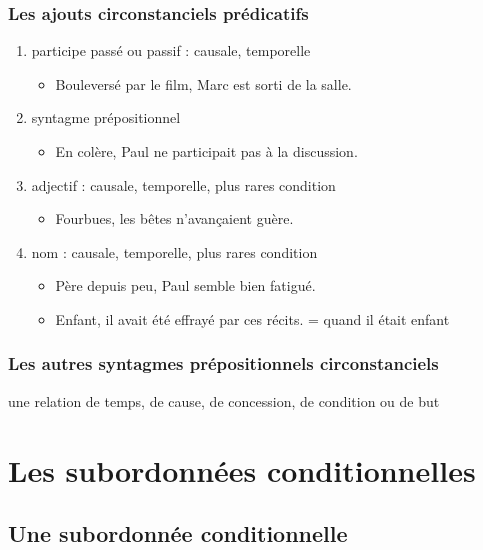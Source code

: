\documentclass[UTF8]{report}
\begin{document}
\subsubsection{Les ajouts circonstanciels prédicatifs}
\begin{enumerate}
    \item participe passé ou passif : causale, temporelle
    \begin{itemize}
        \item Bouleversé par le film, Marc est sorti de la salle.
    \end{itemize}
    \item syntagme prépositionnel
    \begin{itemize}
        \item En colère, Paul ne participait pas à la discussion.
    \end{itemize}
    \item adjectif : causale, temporelle, plus rares condition
    \begin{itemize}
        \item Fourbues, les bêtes n’avançaient guère.
    \end{itemize}
    \item nom : causale, temporelle, plus rares condition
    \begin{itemize}
        \item Père depuis peu, Paul semble bien fatigué.
        \item Enfant, il avait été effrayé par ces récits. = quand il était enfant
    \end{itemize}
\end{enumerate}

\subsubsection{Les autres syntagmes prépositionnels circonstanciels}
une relation de temps, de cause, de concession, de condition ou de but 


\section{Les subordonnées conditionnelles}
\subsection{Une subordonnée conditionnelle}
\end{document}

